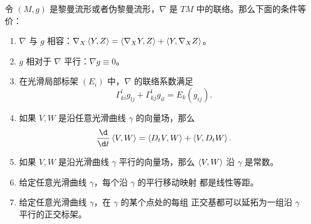 \begin{proposition}[度量联络的特征]\label{prop:metric connection}
  令 $(M,g)$ 是黎曼流形或者伪黎曼流形，$\nabla$ 是 $TM$ 中的联络。那么下面的条件等价：
  \begin{enumerate}
    \item $\nabla$ 与 $g$ 相容：$\nabla_X\left\langle Y,Z\right\rangle=\left\langle \nabla_XY,Z\right\rangle+\left\langle Y,\nabla_XZ\right\rangle$。
    \item $g$ 相对于 $\nabla$ 平行：$\nabla g\equiv 0$。
    \item 在光滑局部标架 $(E_i)$ 中，$\nabla $ 的联络系数满足
    \begin{equation}\label{eq:Delta g equiv 0}
      \Gamma_{ki}^lg_{lj}+\Gamma_{kj}^lg_{il}=E_k(g_{ij}).
    \end{equation}
    \item 如果 $V,W$ 是沿任意光滑曲线 $\gamma$ 的向量场，那么
    \begin{equation}
      \frac{\d}{\d t}\inn{V,W}=\inn{D_tV,W}+\inn{V,D_tW}.
    \end{equation}
    \item 如果 $V,W$ 是沿光滑曲线 $\gamma$ 平行的向量场，那么 $\left\langle V,W\right\rangle$
    沿 $\gamma$ 是常数。
    \item 给定任意光滑曲线 $\gamma$，每个沿 $\gamma$ 的平行移动映射
    都是线性等距。
    \item 给定任意光滑曲线 $\gamma$，在 $\gamma$ 的某个点处的每组
    正交基都可以延拓为一组沿 $\gamma$ 平行的正交标架。
  \end{enumerate}
\end{proposition}
